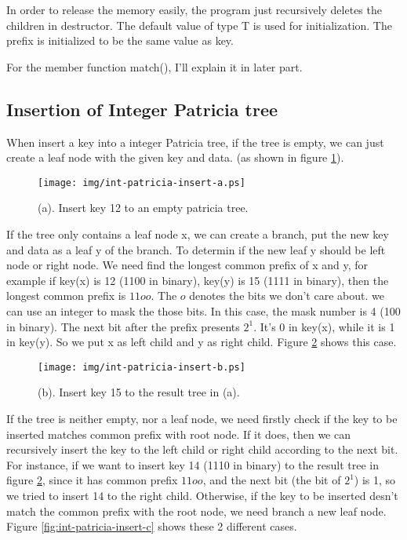 \documentclass{article}
\begin{document}
In order to release the memory easily, the program just recursively
deletes the children in destructor. The default value of type T
is used for initialization. The prefix is initialized to be the same
value as key.

For the member function match(), I'll explain it in later part.

\subsection{Insertion of Integer Patricia tree}
When insert a key into a integer Patricia tree, if the tree is empty,
we can just create a leaf node with the given key and data. (as shown
in figure \ref{fig:int-patricia-insert-a}).

\begin{figure}[htbp]
       \begin{center}
	\texttt{[image: img/int-patricia-insert-a.ps]}
        \caption{(a). Insert key 12 to an empty patricia tree.}
        \label{fig:int-patricia-insert-a}
       \end{center}
\end{figure}

If the tree only contains a leaf node x, we can create a branch, put the new
key and data as a leaf y of the branch. To determin if the new leaf y
should be left node or right node. We need find the longest common prefix
of x and y, for example if key(x) is 12 (1100 in binary), key(y) is 15
(1111 in binary), then the longest common prefix is $11oo$. The $o$
denotes the bits we don't care about. we can use an integer to mask
the those bits. In this case, the mask number is 4 (100 in binary).
The next bit after the prefix presents $2^1$. It's 0 in key(x), while
it is 1 in key(y). So we put x as left child and y as right
child. Figure \ref{fig:int-patricia-insert-b} shows this case.

\begin{figure}[htbp]
       \begin{center}
	\texttt{[image: img/int-patricia-insert-b.ps]}
        \caption{(b). Insert key 15 to the result tree in (a).}
        \label{fig:int-patricia-insert-b}
       \end{center}
\end{figure}

If the tree is neither empty, nor a leaf node, we need firstly check
if the key to be inserted matches common prefix with root node. If it
does, then we can recursively insert the key to the left child or right child
according to the next bit. For instance, if we want to
insert key 14 (1110 in binary) to the result tree in figure 
\ref{fig:int-patricia-insert-b}, since it has common prefix $11oo$,
and the next bit (the bit of $2^1$) is 1, so we tried to insert 14 to
the right child. Otherwise, if the key to be inserted desn't match the
common prefix with the root node, we need branch a new leaf
node. Figure \ref{fig:int-patricia-insert-c} shows these 2 different cases.
\end{document}
